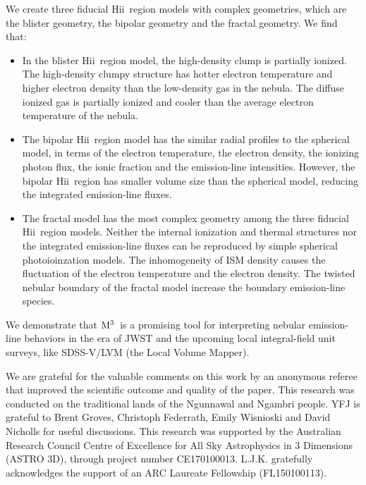 \documentclass[twocolumn]{aastex62}
\newcommand{\newcode}{{$\rm M^3$}}
\newcommand{\hiireg}{{H{\sc ii}}}
\begin{document}
\begin{CJK*}{UTF8}{gbsn}
We create three fiducial \hiireg\ region models with complex geometries, which are the blister geometry, the bipolar geometry and the fractal geometry.
We find that:
\begin{itemize}
  \item In the blister \hiireg\ region model, the high-density clump is partially ionized.
           The high-density clumpy structure has hotter electron temperature and higher electron density than the low-density gas in the nebula. 
           The diffuse ionized gas is partially ionized and cooler than the average electron temperature of the nebula.            
  \item The bipolar \hiireg\ region model has the similar radial profiles to the spherical model, in terms of the electron temperature, the electron density, the ionizing photon flux, the ionic fraction and the emission-line intensities. 
           However, the bipolar \hiireg\ region has smaller volume size than the spherical model, reducing the integrated emission-line fluxes.
  \item The fractal model has the most complex geometry among the three fiducial \hiireg\ region models.
           Neither the internal ionization and thermal structures nor the integrated emission-line fluxes can be reproduced by simple spherical photoioinzation models.
           The inhomogeneity of ISM density causes the fluctuation of the electron temperature and the electron density.
           The twisted nebular boundary of the fractal model increase the boundary emission-line species.           
\end{itemize}

We demonstrate that \newcode\ is a promising tool for interpreting nebular emission-line behaviors in the era of JWST and the upcoming local integral-field unit surveys, like SDSS-V/LVM (the Local Volume Mapper).

\vspace{25pt}

We are grateful for the valuable comments on this work by an anonymous referee that improved the scientific outcome and quality of the paper. 
This research was conducted on the traditional lands of the Ngunnawal and Ngambri
people.
YFJ is grateful to Brent Groves, Christoph Federrath, Emily Wisnioski and David Nicholls for useful discussions. This research was supported by the Australian Research Council Centre of Excellence for All Sky Astrophysics in 3 Dimensions (ASTRO 3D), through project number CE170100013. L.J.K. gratefully acknowledges the support of an ARC Laureate Fellowship (FL150100113).


\end{CJK*}
\end{document}
